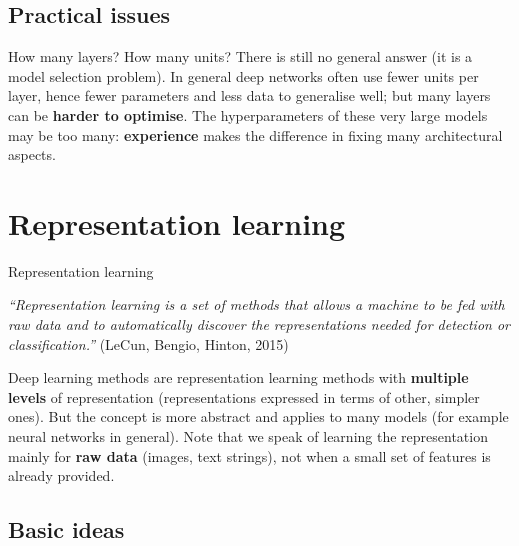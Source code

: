 \subsection{Practical issues}\label{questioni-pratiche}

How many layers? How many units? There is still no general answer (it
is a model selection problem). In general deep networks often use fewer
units per layer, hence fewer parameters and less data to generalise
well; but many layers can be \textbf{harder to optimise}. The
hyperparameters of these very large models may be too many:
\textbf{experience} makes the difference in fixing many architectural
aspects.

\section{Representation learning}\label{representation-learning}

\begin{boxdefinition}{Representation learning}

\emph{``Representation learning is a set of methods that allows a
machine to be fed with raw data and to automatically discover the
representations needed for detection or classification.''} (LeCun,
Bengio, Hinton, 2015)

\end{boxdefinition}

Deep learning methods are representation learning methods with
\textbf{multiple levels} of representation (representations expressed
in terms of other, simpler ones). But the concept is more abstract and
applies to many models (for example neural networks in general). Note
that we speak of learning the representation mainly for \textbf{raw
data} (images, text strings), not when a small set of features is
already provided.

\subsection{Basic ideas}\label{idee-di-base}

